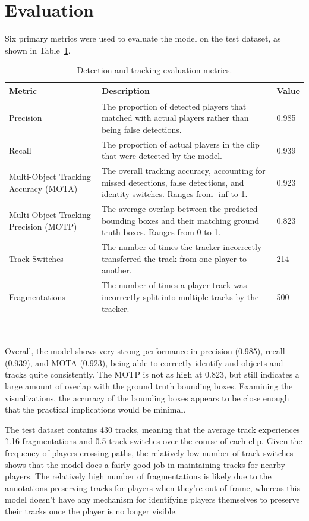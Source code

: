 \documentclass[12pt,stu,donotrepeattitle,floatsintext]{apa7}
\newcommand{\customsection}[2]{
  \phantomsection
  \section*{#1}\label{#2}
  \addcontentsline{toc}{section}{#1}
}
\begin{document}
    \customsection{Evaluation}{evaluation}

    Six primary metrics were used to evaluate the model on the test dataset, as shown in Table~\ref{tab:evaluation-metrics}.

    \begin{table}[tb]
        \centering
        \renewcommand{\arraystretch}{1}
        \begin{tabular}{|p{5cm}|p{8cm}|p{2cm}|}
            \hline
            \textbf{Metric} & \textbf{Description} & \textbf{Value} \\ \hline
            Precision & The proportion of detected players that matched with actual players rather than being false detections. & 0.985 \\ \hline
            Recall & The proportion of actual players in the clip that were detected by the model. & 0.939 \\ \hline
            Multi-Object Tracking Accuracy (MOTA) & The overall tracking accuracy, accounting for missed detections, false detections, and identity switches. Ranges from -inf to 1. & 0.923 \\ \hline
            Multi-Object Tracking Precision (MOTP) & The average overlap between the predicted bounding boxes and their matching ground truth boxes. Ranges from 0 to 1. & 0.823 \\ \hline
            Track Switches & The number of times the tracker incorrectly transferred the track from one player to another. & 214 \\ \hline
            Fragmentations & The number of times a player track was incorrectly split into multiple tracks by the tracker. & 500 \\ \hline
        \end{tabular}
        \\[10pt]
        \caption{Detection and tracking evaluation metrics.}
        \label{tab:evaluation-metrics}
    \end{table}

    Overall, the model shows very strong performance in precision (0.985), recall (0.939), and MOTA (0.923), being able to correctly identify and objects and tracks quite consistently.
    The MOTP is not as high at 0.823, but still indicates a large amount of overlap with the ground truth bounding boxes.
    Examining the visualizations, the accuracy of the bounding boxes appears to be close enough that the practical implications would be minimal.

    The test dataset contains 430 tracks, meaning that the average track experiences \~1.16 fragmentations and \~0.5 track switches over the course of each clip.
    Given the frequency of players crossing paths, the relatively low number of track switches shows that the model does a fairly good job in maintaining tracks for nearby players.
    The relatively high number of fragmentations is likely due to the annotations preserving tracks for players when they're out-of-frame, whereas this model doesn't have any mechanism for identifying players themselves to preserve their tracks once the player is no longer visible.
\end{document}
